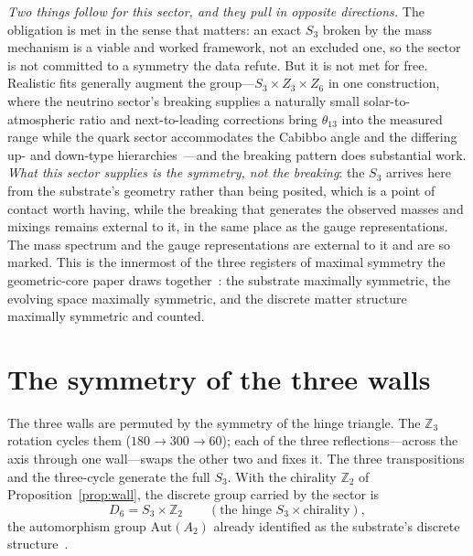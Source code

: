 \documentclass[11pt]{article}
\begin{document}
\emph{Two things follow for this sector, and they pull in opposite directions.} The obligation is met in the
sense that matters: an exact $S_3$ broken by the mass mechanism is a viable and worked framework, not an
excluded one, so the sector is not committed to a symmetry the data refute. But it is not met for free.
Realistic fits generally augment the group---$S_3\times Z_3\times Z_6$ in one construction, where the neutrino
sector's breaking supplies a naturally small solar-to-atmospheric ratio and next-to-leading corrections bring
$\theta_{13}$ into the measured range while the quark sector accommodates the Cabibbo angle and the differing
up- and down-type hierarchies~\cite{Meloni2012}---and the breaking pattern does substantial work. \emph{What
this sector supplies is the symmetry, not the breaking}: the $S_3$ arrives here from the substrate's geometry
rather than being posited, which is a point of contact worth having, while the breaking that generates the
observed masses and mixings remains external to it, in the same place as the gauge representations.
 The mass spectrum and the gauge representations are external to it and are so marked. This is the innermost of the three registers of maximal symmetry the geometric-core paper draws together~\cite{JanzenGeometricCore}: the substrate maximally symmetric, the evolving space maximally symmetric, and the discrete matter structure maximally symmetric and counted.



\section{The symmetry of the three walls}\label{sec:family}

The three walls are permuted by the symmetry of the hinge triangle. The $\mathbb{Z}_3$ rotation cycles them ($180\!\to\!300\!\to\!60$); each of the three reflections---across the axis through one wall---swaps the other two and fixes it. The three transpositions and the three-cycle generate the full $S_3$. With the chirality $\mathbb{Z}_2$ of Proposition~\ref{prop:wall}, the discrete group carried by the sector is
\begin{equation}
D_6 = S_3 \times \mathbb{Z}_2 \qquad (\text{the hinge }S_3\times\text{chirality}),
\end{equation}
the automorphism group $\mathrm{Aut}(A_2)$ already identified as the substrate's discrete structure~\cite{JanzenSlicing,JanzenGroupoid,JanzenAlgebroid}.
\end{document}
